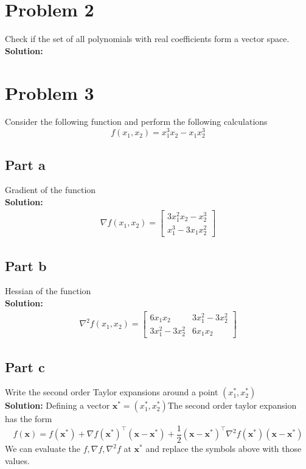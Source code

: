 \documentclass[11pt]{article}
\begin{document}
\section{Problem 2}
Check if the set of all polynomials with real coefficients form a vector space.
\\
\textbf{Solution: }

\section{Problem 3}
Consider the following function and perform the following calculations
\begin{equation*}
    f(x_1, x_2) = x_1^3 x_2 - x_1 x_2^3
\end{equation*}

\subsection{Part a}
Gradient of the function
\\
\textbf{Solution: }
\begin{align*}
    \nabla f(x_1, x_2) = 
  \begin{bmatrix}
     3x_1^2 x_2 - x_2^3 \\
     x_1^3 - 3x_1 x_2^2
  \end{bmatrix}
\end{align*}

\subsection{Part b}
Hessian of the function
\\
\textbf{Solution: }
\begin{align*}
    \nabla^2 f(x_1, x_2) = 
  \begin{bmatrix}
     6x_1 x_2 & 3x_1^2 - 3x_2^2 \\
     3x_1^2 - 3x_2^2 &  6 x_1 x_2
  \end{bmatrix}
\end{align*}

\subsection{Part c}
Write the second order Taylor expansions around a point $(x_1^*, x_2^*)$
\\
\textbf{Solution: }
Defining a vector $\textbf{x}^* = (x_1^*, x_2^*)$The second order taylor expansion has the form
\begin{equation*}
  f(\textbf{x}) = f(\textbf{x}^*) + \nabla f(\textbf{x}^*)^\top (\textbf{x} - \textbf{x}^*) + \frac{1}{2} (\textbf{x} - \textbf{x}^*)^\top \nabla^2 f(\textbf{x}^*)(\textbf{x} - \textbf{x}^*)
\end{equation*}
We can evaluate the $f, \nabla f, \nabla^2 f$ at $\textbf{x}^*$ and replace the symbols above with those values.
\end{document}
